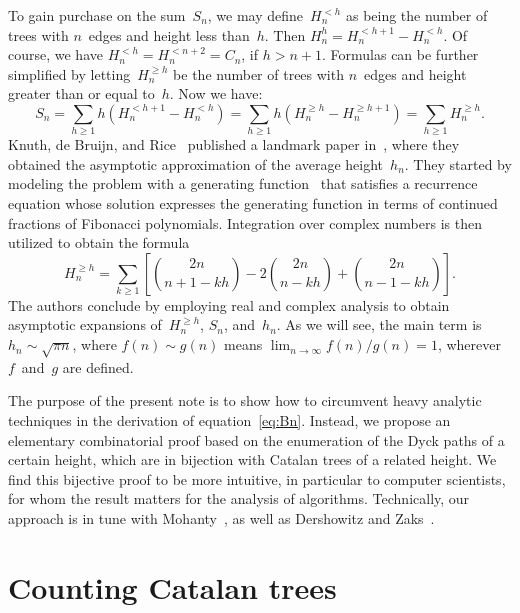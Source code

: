 \documentclass[11pt]{article}
\newcommand{\A}[2]{H_{#1}^{<#2}}
\newcommand{\B}[2]{H_{#1}^{\geqslant #2}}
\begin{document}
To gain purchase on the sum~\(S_n\), we may define~\(\A{n}{h}\) as
being the number of trees with \(n\)~edges and height less
than~\(h\). Then \(H_{n}^{h} = \A{n}{h+1}-\A{n}{h}\).  Of course, we
have \(\A{n}{h} = \A{n}{n+2} = C_{n}\), if \(h > n+1\).  Formulas can
be further simplified by letting~\(\B{n}{h}\) be the number of trees
with \(n\)~edges and height greater than or equal to~\(h\).  Now we
have:
\begin{equation}
S_n = \sum_{h \geqslant 1}h\left(\A{n}{h+1}-\A{n}{h}\right)
    = \sum_{h \geqslant 1}h\left(\B{n}{h}-\B{n}{h+1}\right) = \sum_{h\geqslant 1} \B{n}{h}.
\label{eq:Sn}
\end{equation} 
Knuth, de Bruijn, and Rice~\cite{KnuthdeBruijnRice:1972} published a
landmark paper in~, where they obtained the
asymptotic approximation of the average height~\(h_n\). They started
by modeling the problem with a generating function~\cite{Wilf:1990}
that satisfies a recurrence equation whose solution expresses the
generating function in terms of continued fractions of Fibonacci
polynomials. Integration over complex numbers is then utilized to
obtain the formula
\begin{equation}
\B{n}{h} = \sum_{k \geqslant 1}\left[\binom{2n}{n+1-kh}
           - 2\binom{2n}{n-kh} + \binom{2n}{n-1-kh}\right].
\label{eq:Bn}
\end{equation}
The authors conclude by employing real and complex analysis to obtain
asymptotic expansions of~\(\B{n}{h}\), \(S_n\), and~\(h_n\). As we
will see, the main term is \(h_n \sim \sqrt{\pi n}\), where \(f(n)
\sim g(n)\) means \(\lim_{n \rightarrow \infty} f(n)/g(n) = 1\),
wherever \(f\)~and~\(g\) are defined.
  
The purpose of the present note is to show how to circumvent heavy
analytic techniques in the derivation of
equation~\eqref{eq:Bn}. Instead, we propose an elementary
combinatorial proof based on the enumeration of the Dyck paths of a
certain height, which are in bijection with Catalan trees of a related
height. We find this bijective proof to be more intuitive, in
particular to computer scientists, for whom the result matters for the
analysis of algorithms. Technically, our approach is in tune with
Mohanty~\cite{Mohanty:1979}, as well as Dershowitz and
Zaks~\cite{DershowitzZaks:1981}.

\section*{Counting Catalan trees}
\end{document}
